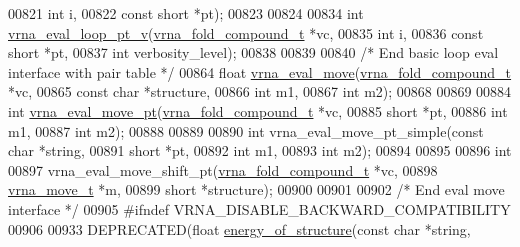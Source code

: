 \begin{DoxyCode}
00821                       \textcolor{keywordtype}{int}                   i,
00822                       \textcolor{keyword}{const} \textcolor{keywordtype}{short}           *pt);
00823 
00824 
00834 \textcolor{keywordtype}{int} \hyperlink{group__eval_ga30faecaff1009fe62c58312c8d56dabb}{vrna\_eval\_loop\_pt\_v}(\hyperlink{group__fold__compound_structvrna__fc__s}{vrna\_fold\_compound\_t}  *vc,
00835                         \textcolor{keywordtype}{int}                   i,
00836                         \textcolor{keyword}{const} \textcolor{keywordtype}{short}           *pt,
00837                         \textcolor{keywordtype}{int}                   verbosity\_level);
00838 
00839 
00840 \textcolor{comment}{/* End basic loop eval interface with pair table */}
00864 \textcolor{keywordtype}{float} \hyperlink{group__eval_gaff1b9e4f4d17b434b0a822fe783672c1}{vrna\_eval\_move}(\hyperlink{group__fold__compound_structvrna__fc__s}{vrna\_fold\_compound\_t} *vc,
00865                      \textcolor{keyword}{const} \textcolor{keywordtype}{char}           *structure,
00866                      \textcolor{keywordtype}{int}                  m1,
00867                      \textcolor{keywordtype}{int}                  m2);
00868 
00869 
00884 \textcolor{keywordtype}{int} \hyperlink{group__eval_ga123dabc119ea98c968a5e903cc46f0fb}{vrna\_eval\_move\_pt}(\hyperlink{group__fold__compound_structvrna__fc__s}{vrna\_fold\_compound\_t}  *vc,
00885                       \textcolor{keywordtype}{short}                 *pt,
00886                       \textcolor{keywordtype}{int}                   m1,
00887                       \textcolor{keywordtype}{int}                   m2);
00888 
00889 
00890 \textcolor{keywordtype}{int} vrna\_eval\_move\_pt\_simple(\textcolor{keyword}{const} \textcolor{keywordtype}{char} *\textcolor{keywordtype}{string},
00891                              \textcolor{keywordtype}{short}      *pt,
00892                              \textcolor{keywordtype}{int}        m1,
00893                              \textcolor{keywordtype}{int}        m2);
00894 
00895 
00896 \textcolor{keywordtype}{int}
00897 vrna\_eval\_move\_shift\_pt(\hyperlink{group__fold__compound_structvrna__fc__s}{vrna\_fold\_compound\_t}  *vc,
00898                         \hyperlink{group__neighbors_structvrna__move__s}{vrna\_move\_t}           *m,
00899                         \textcolor{keywordtype}{short}                 *structure);
00900 
00901 
00902 \textcolor{comment}{/* End eval move interface */}
00905 \textcolor{preprocessor}{#ifndef VRNA\_DISABLE\_BACKWARD\_COMPATIBILITY}
00906 
00933 DEPRECATED(\textcolor{keywordtype}{float} \hyperlink{group__eval_gaf93986cb3cb29770ec9cca69c9fab8cf}{energy\_of\_structure}(\textcolor{keyword}{const} \textcolor{keywordtype}{char} *\textcolor{keywordtype}{string},

\end{DoxyCode}
